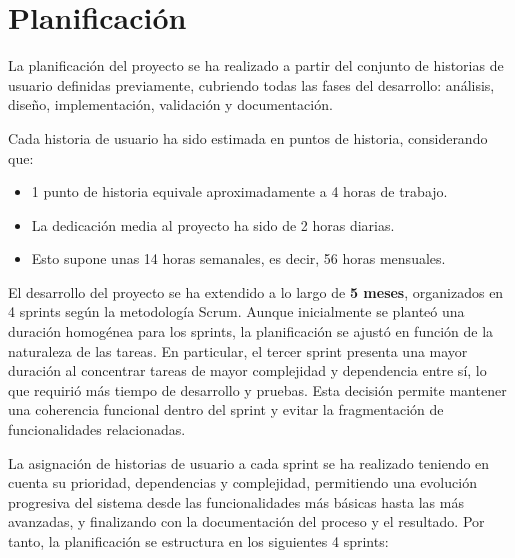 \section{Planificación}

La planificación del proyecto se ha realizado a partir del conjunto de historias de usuario definidas previamente, cubriendo todas las fases del desarrollo: análisis, diseño, implementación, validación y documentación.


Cada historia de usuario ha sido estimada en puntos de historia, considerando que:
\begin{itemize}
    \item 1 punto de historia equivale aproximadamente a 4 horas de trabajo.
    \item La dedicación media al proyecto ha sido de 2 horas diarias.
    \item Esto supone unas 14 horas semanales, es decir, 56 horas mensuales.
\end{itemize}



El desarrollo del proyecto se ha extendido a lo largo de \textbf{5 meses}, organizados en 4 sprints según la metodología Scrum. Aunque inicialmente se planteó una duración homogénea para los sprints, la planificación se ajustó en función de la naturaleza de las tareas. En particular, el tercer sprint presenta una mayor duración al concentrar tareas de mayor complejidad y dependencia entre sí, lo que requirió más tiempo de desarrollo y pruebas. Esta decisión permite mantener una coherencia funcional dentro del sprint y evitar la fragmentación de funcionalidades relacionadas.



La asignación de historias de usuario a cada sprint se ha realizado teniendo en cuenta su prioridad, dependencias y complejidad, permitiendo una evolución progresiva del sistema desde las funcionalidades más básicas hasta las más avanzadas, y finalizando con la documentación del proceso y el resultado. Por tanto, la planificación se estructura en los siguientes 4 sprints:

